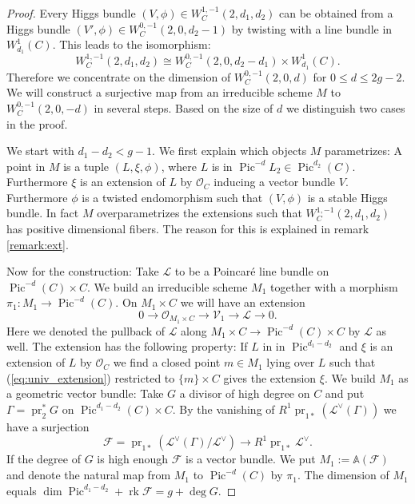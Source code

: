\documentclass[12pt]{extarticle}
\theoremstyle{definition}
\numberwithin{theorem}{section}
\newcommand{\Aff}{\mathbb{A}}
\newcommand{\OO}{\mathcal{O}}
\newcommand{\cL}{\mathcal{L}}
\newcommand{\cV}{\mathcal{V}}
\newcommand{\cF}{\mathcal{F}}
\newcommand{\op}{\operatorname}
\begin{document}
\begin{proof}
Every Higgs bundle $(V,\phi) \in W^{1,-1}_C(2,d_1,d_2)$ can be obtained from a Higgs bundle $(V',\phi) \in W^{0,-1}_C(2,0,d_2-1)$ by twisting with a line bundle in $W^1_{d_1}(C)$. This leads to the isomorphism:
\begin{equation*}
	W^{1,-1}_C(2,d_1,d_2) \cong W^{0,-1}_C(2,0,d_2-d_1)\times W^1_{d_1}(C).
\end{equation*}
Therefore we concentrate on the dimension of $W^{0,-1}_C(2,0,d)$ for $0 \leq d \leq 2g-2$.
 We will construct a surjective map from an irreducible scheme $M$ to $W^{0,-1}_C(2,0,-d)$ in several steps. Based on the size of $d$ we distinguish two cases in the proof.   

We start with $d_1 - d_2 < g-1$. We first explain which objects $M$ parametrizes: A point in $M$ is a tuple $(L,\xi,\phi)$, where $L$ is in $\op{Pic}^{-d}$$L_2 \in \op{Pic}^{d_2}(C)$. Furthermore $\xi$ is an extension of $L$ by $\OO_C$ inducing a vector bundle $V$. Furthermore $\phi$ is a twisted endomorphism such that $(V,\phi)$ is a stable Higgs bundle. In fact $M$ overparametrizes the extensions such that $W_C^{1,-1}(2,d_1,d_2)$ has positive dimensional fibers. The reason for this is explained in remark \ref{remark:ext}.
 
Now for the construction: Take $\cL$ to be a Poincaré line bundle on $\op{Pic}^{-d}(C)\times C$. We build an irreducible scheme $M_1$ together with a morphism $\pi_1: M_1 \to \op{Pic}^{-d}(C)$. On $M_1\times C$ we will have an extension 
\begin{equation}\label{eq:univ_extension}
0 \to \OO_{M_1 \times C} \to \cV_1 \to \cL \to 0.
\end{equation}
Here we denoted the pullback of $\cL$ along $M_1\times C \to \op{Pic}^{-d}(C) \times C$ by $\cL$ as well. The extension has the following property: If $L$ in in $\op{Pic}^ {d_1-d_2}$ and $\xi$ is an extension of $L$ by $\OO_C$ we find a closed point $m \in M_1 $ lying over $L$ such that (\ref{eq:univ_extension}) restricted to $\{m\}\times C$ gives the extension $\xi$. We build $M_1$ as a geometric vector bundle: Take $G$ a divisor of high degree on $C$ and put $\Gamma = \op{pr}^*_2G$ on $\op{Pic}^{d_1-d_2}(C)\times C$. By the vanishing of $R^1\op{pr}_{1*}\left(\cL^\vee(\Gamma)\right)$ we have a surjection 
\begin{equation*}
\mathcal{F}=\op{pr}_{1*}\left(\cL^\vee(\Gamma)/\cL^\vee\right) \to R^1\op{pr}_{1*}\cL^\vee.
\end{equation*}
If the degree of $G$ is high enough $\mathcal{F}$ is a vector bundle. We put $M_1 := \Aff(\mathcal{F})$ and denote the natural map from $M_1$ to $\op{Pic}^{-d}(C)$ by $\pi_1$. 
The dimension of $M_1$ equals $\dim \op{Pic}^{d_1-d_2} + \op{rk} \cF = g + \deg G$.


\end{proof}
\end{document}
